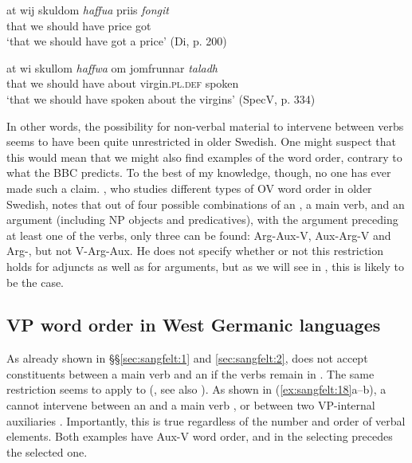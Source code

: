 \documentclass[output=paper, colorlinks, citecolor=brown]{langscibook}
\begin{document}
\ex\label{ex:sangfelt:17c}
\gll at wij skuldom \textit{haffua} {priis} \textit{fongit} \\
 that we should have price got\\
\glt ‘that we should have got a price' (Di, p. 200)

\ex\label{ex:sangfelt:17d}
\gll at wi skullom \textit{haffwa} {om} {jomfrunnar} \textit{taladh} \\
 that we should have about virgin.\textsc{pl.def} spoken\\
\glt ‘that we should have spoken about the virgins’ (SpecV, p. 334)
\z 
\z 

In other words, the possibility for non-verbal material to intervene between verbs seems to have been quite unrestricted in older Swedish. One might suspect that this would mean that we might also find examples of the  word order, contrary to what the BBC predicts. To the best of my knowledge, though, no one has ever made such a claim. \citet[155, 158–160]{Petzell2011}, who studies different types of OV word order in older Swedish, notes that out of four possible combinations of an , a main verb, and an argument (including NP objects and predicatives), with the argument preceding at least one of the verbs, only three can be found: Arg-Aux-V, Aux-Arg-V and Arg-, but not V-Arg-Aux. He does not specify whether or not this restriction holds for adjuncts as well as for arguments, but as we will see in , this is likely to be the case.

\subsection{VP word order in West Germanic languages}\label{sec:sangfelt:3.3}

As already shown in §§\ref{sec:sangfelt:1} and \ref{sec:sangfelt:2},  does not accept constituents between a main verb and an  if the verbs remain in . The same restriction seems to apply to  (\citealt[290--291]{Haider2010}, see also \citealt{Wurmbrand2004}). As shown in (\ref{ex:sangfelt:18}a–b), a  cannot intervene between an  and a main verb , or between two VP-internal auxiliaries . Importantly, this is true regardless of the number and order of verbal elements. Both examples have Aux-V word order, and in  the selecting  precedes the selected one.
\end{document}

